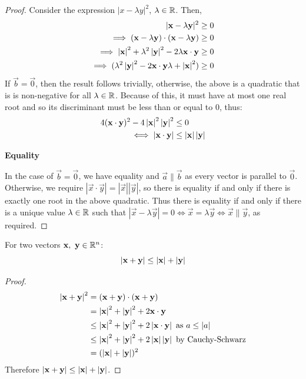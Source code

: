 \documentclass[../main.tex]{subfiles}
\begin{document}
\begin{proof}
  Consider the expression $|x - \lambda y|^2$, $\lambda \in \mathbb{R}$.
  Then,
  \begin{align*}
    |\mathbf{\bm{x}} - \lambda\mathbf{\bm{y}}|^2 &\geq 0 \\
    \implies (\mathbf{\bm{x}} - \lambda \mathbf{\bm{y}}) \cdot (\mathbf{\bm{x}} - \lambda \mathbf{\bm{y}}) &\geq 0 \\
    \implies \left\lvert \mathbf{\bm{x}} \right\rvert^2 + \lambda^2 \left\lvert \mathbf{\bm{y}} \right\rvert^2 - 2\lambda \mathbf{\bm{x}} \cdot \mathbf{\bm{y}} &\geq 0 \\
    \implies (\lambda^2 \left\lvert \mathbf{\bm{y}} \right\rvert^2 - 2 \mathbf{\bm{x}} \cdot \mathbf{\bm{y}} \lambda + \left\lvert \mathbf{\bm{x}} \right\rvert^2) &\geq 0
  \end{align*}
  If $\vec{b} = \vec{0}$, then the result follows trivially, otherwise, the above is a quadratic that is is non-negative for all $\lambda \in \mathbb{R}$.
  Because of this, it must have at most one real root and so its discriminant must be less than or equal to 0, thus:
  \begin{align*}
    4(\mathbf{\bm{x}} \cdot \mathbf{\bm{y}})^2 - 4 \left\lvert \mathbf{\bm{x}} \right\rvert^2 \left\lvert \mathbf{\bm{y}} \right\rvert^2 &\leq 0 \\
    \iff \left\lvert \mathbf{\bm{x}} \cdot \mathbf{\bm{y}} \right\rvert &\leq \left\lvert \mathbf{\bm{x}} \right\rvert \left\lvert \mathbf{\bm{y}} \right\rvert
  \end{align*}

  \textbf{Equality}\par
    In the case of $\vec{b} = \vec{0}$, we have equality and $\vec{a} \parallel \vec{b}$ as every vector is parallel to $\vec{0}$.
    Otherwise, we require $|\vec{x} \cdot \vec{y}| = |\vec{x}||\vec{y}|$, so there is equality if and only if there is exactly one root in the above quadratic.
    Thus there is equality if and only if there is a unique value $\lambda \in \mathbb{R}$ such that $|\vec{x} - \lambda \vec{y}| = 0 \iff \vec{x} = \lambda \vec{y} \iff \vec{x} \parallel \vec{y}$, as required.
\end{proof}
\begin{corollary}
  For two vectors $\mathbf{\bm{x}},\ \mathbf{\bm{y}} \in \mathbb{R}^{n}$:
  \[
    \left\lvert \mathbf{\bm{x}} + \mathbf{\bm{y}} \right\rvert \leq \left\lvert \mathbf{\bm{x}} \right\rvert + \left\lvert \mathbf{\bm{y}} \right\rvert
  \]
\end{corollary}
\begin{proof}
  \begin{align*}
    \left\lvert \mathbf{\bm{x}} + \mathbf{\bm{y}} \right\rvert^2 &= (\mathbf{\bm{x}} + \mathbf{\bm{y}}) \cdot (\mathbf{\bm{x}} + \mathbf{\bm{y}}) \\
                              &= \left\lvert \mathbf{\bm{x}} \right\rvert^2 + \left\lvert \mathbf{\bm{y}} \right\rvert^2 + 2 \mathbf{\bm{x}} \cdot \mathbf{\bm{y}} \\
                              &\leq \left\lvert \mathbf{\bm{x}} \right\rvert^2 + \left\lvert \mathbf{\bm{y}} \right\rvert^2 + 2 \left\lvert \mathbf{\bm{x}} \cdot \mathbf{\bm{y}} \right\rvert \text{ as $a \leq |a|$}\\
                              &\leq \left\lvert \mathbf{\bm{x}} \right\rvert^2 + \left\lvert \mathbf{\bm{y}} \right\rvert^2 + 2 \left\lvert \mathbf{\bm{x}} \right\rvert\left\lvert \mathbf{\bm{y}} \right\rvert \text{ by Cauchy-Schwarz}\\
                              &= (\left\lvert \mathbf{\bm{x}} \right\rvert + \left\lvert \mathbf{\bm{y}} \right\rvert)^2
  \end{align*}
  Therefore $\left\lvert \mathbf{\bm{x}} + \mathbf{\bm{y}} \right\rvert \leq \left\lvert \mathbf{\bm{x}} \right\rvert + \left\lvert \mathbf{\bm{y}} \right\rvert$.
\end{proof}
\end{document}
